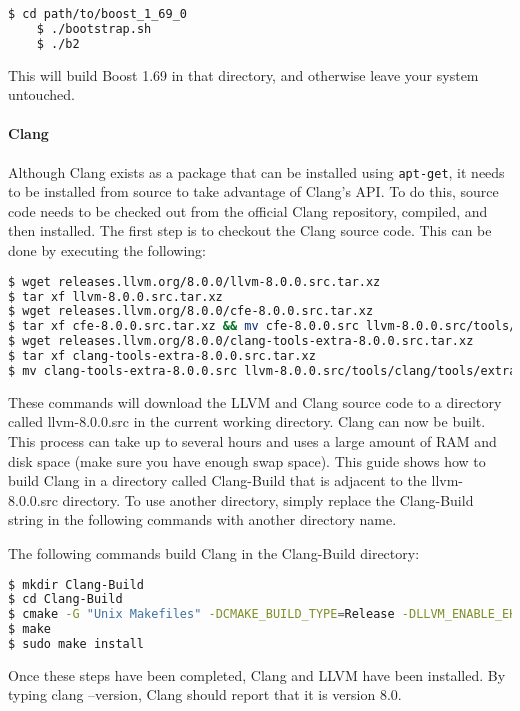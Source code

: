 \begin{lstlisting}[language=bash]
	$ cd path/to/boost_1_69_0
	$ ./bootstrap.sh
	$ ./b2
\end{lstlisting}

\noindent This will build Boost 1.69 in that directory, and otherwise leave your
system untouched.

\paragraph{Clang}

Although Clang exists as a package that can be installed using \texttt{apt-get}, it needs
to be installed from source to take advantage of Clang’s API. To do this,
source code needs to be checked out from the official Clang repository, compiled,
and then installed. The first step is to checkout the Clang source code.
This can be done by executing the following:

\begin{lstlisting}[language=bash]
$ wget releases.llvm.org/8.0.0/llvm-8.0.0.src.tar.xz
$ tar xf llvm-8.0.0.src.tar.xz
$ wget releases.llvm.org/8.0.0/cfe-8.0.0.src.tar.xz
$ tar xf cfe-8.0.0.src.tar.xz && mv cfe-8.0.0.src llvm-8.0.0.src/tools/clang
$ wget releases.llvm.org/8.0.0/clang-tools-extra-8.0.0.src.tar.xz
$ tar xf clang-tools-extra-8.0.0.src.tar.xz 
$ mv clang-tools-extra-8.0.0.src llvm-8.0.0.src/tools/clang/tools/extra
\end{lstlisting}

These commands will download the LLVM and Clang source code to a directory called
llvm-8.0.0.src in the current working directory. Clang can now be built. This process
can take up to several hours and uses a large amount of RAM and disk space (make
sure you have enough swap space). This guide shows how to build Clang in a
directory called Clang-Build that is adjacent to the llvm-8.0.0.src directory. To use
another directory, simply replace the Clang-Build string in the following
commands with another directory name.

The following commands build Clang in the Clang-Build directory:

\begin{lstlisting}[language=bash]
$ mkdir Clang-Build
$ cd Clang-Build
$ cmake -G "Unix Makefiles" -DCMAKE_BUILD_TYPE=Release -DLLVM_ENABLE_EH=ON -DLLVM_ENABLE_RTTI=ON ../llvm-8.0.0.src
$ make
$ sudo make install
\end{lstlisting}

Once these steps have been completed, Clang and LLVM have been installed.
By typing clang --version, Clang should report that it is version 8.0.

